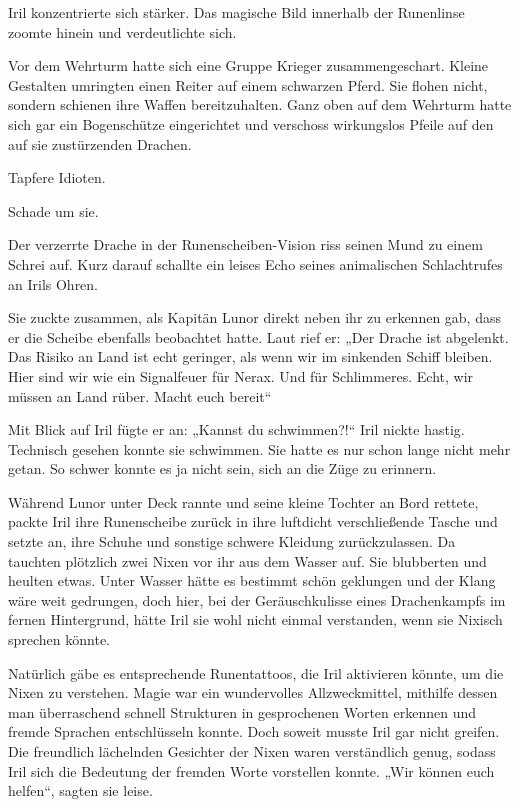 Iril konzentrierte sich stärker. Das magische Bild innerhalb der Runenlinse zoomte hinein und verdeutlichte sich.

Vor dem Wehrturm hatte sich eine Gruppe Krieger zusammengeschart. Kleine Gestalten umringten einen Reiter auf einem schwarzen Pferd. Sie flohen nicht, sondern schienen ihre Waffen bereitzuhalten. Ganz oben auf dem Wehrturm hatte sich gar ein Bogenschütze eingerichtet und verschoss wirkungslos Pfeile auf den auf sie zustürzenden Drachen.

Tapfere Idioten.

Schade um sie.

Der verzerrte Drache in der Runenscheiben-Vision riss seinen Mund zu einem Schrei auf. Kurz darauf schallte ein leises Echo seines animalischen Schlachtrufes an Irils Ohren.

Sie zuckte zusammen, als Kapitän Lunor direkt neben ihr zu erkennen gab, dass er die Scheibe ebenfalls beobachtet hatte. Laut rief er: „Der Drache ist abgelenkt. Das Risiko an Land ist echt geringer, als wenn wir im sinkenden Schiff bleiben. Hier sind wir wie ein Signalfeuer für Nerax. Und für Schlimmeres. Echt, wir müssen an Land rüber. Macht euch bereit“

Mit Blick auf Iril fügte er an: „Kannst du schwimmen?!“ Iril nickte hastig. Technisch gesehen konnte sie schwimmen. Sie hatte es nur schon lange nicht mehr getan. So schwer konnte es ja nicht sein, sich an die Züge zu erinnern.

Während Lunor unter Deck rannte und seine kleine Tochter an Bord rettete, packte Iril ihre Runenscheibe zurück in ihre luftdicht verschließende Tasche und setzte an, ihre Schuhe und sonstige schwere Kleidung zurückzulassen. Da tauchten plötzlich zwei Nixen vor ihr aus dem Wasser auf. Sie blubberten und heulten etwas. Unter Wasser hätte es bestimmt schön geklungen und der Klang wäre weit gedrungen, doch hier, bei der Geräuschkulisse eines Drachenkampfs im fernen Hintergrund, hätte Iril sie wohl nicht einmal verstanden, wenn sie Nixisch sprechen könnte.

Natürlich gäbe es entsprechende Runentattoos, die Iril aktivieren könnte, um die Nixen zu verstehen. Magie war ein wundervolles Allzweckmittel, mithilfe dessen man überraschend schnell Strukturen in gesprochenen Worten erkennen und fremde Sprachen entschlüsseln konnte. Doch soweit musste Iril gar nicht greifen. Die freundlich lächelnden Gesichter der Nixen waren verständlich genug, sodass Iril sich die Bedeutung der fremden Worte vorstellen konnte. „Wir können euch helfen“, sagten sie leise.

